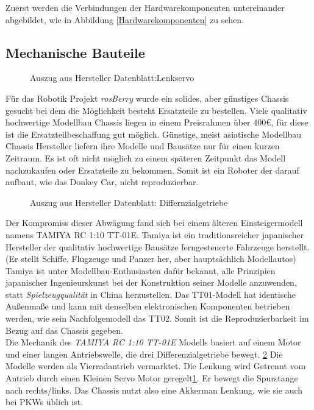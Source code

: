\documentclass[conference]{IEEEtran}
\begin{document}
	Zuerst werden die Verbindungen der Hardwarekomponenten untereinander abgebildet, wie in Abbildung \ref{Hardwarekomponenten} zu sehen.
	\subsection{Mechanische Bauteile}
	
	\begin{figure} [!h]
		\centering
		\caption{Auszug aus Hersteller Datenblatt:Lenkservo }
		\label{Servomotor}
	\end{figure}
	Für das Robotik Projekt \textit{rosBerry} wurde ein solides, aber günstiges Chassis gesucht bei dem die Möglichkeit besteht Ersatzteile zu bestellen. Viele qualitativ hochwertige Modellbau Chassis liegen in einem Preisrahmen über 400€, für diese ist die Ersatzteilbeschaffung gut möglich. Günstige, meist asiatische Modellbau Chassis Hersteller liefern ihre Modelle und Bausätze nur für einen kurzen Zeitraum. Es ist oft nicht möglich zu einem späteren Zeitpunkt das Modell nachzukaufen oder Ersatzteile zu bekommen. Somit ist ein Roboter der darauf aufbaut, wie das Donkey Car, nicht reproduzierbar. 
	\\
	\begin{figure} %
		\centering
		\caption{Auszug aus Hersteller Datenblatt: Differnzialgetriebe }
		\label{Getriebe}
	\end{figure}
	Der Kompromiss dieser Abwägung fand sich bei einem älteren 
	Einsteigermodell namens TAMIYA RC 1:10 TT-01E. Tamiya ist ein 
	traditionsreicher japanischer Hersteller der qualitativ hochwertige Bausätze 
	ferngesteuerte Fahrzeuge herstellt. (Er stellt Schiffe, Flugzeuge und Panzer 
	her, aber hauptsächlich Modellautos) Tamiya ist unter 
	Modellbau-Enthusiasten dafür bekannt, alle Prinzipien japanischer 
	Ingenieurskunst bei der Konstruktion seiner Modelle anzuwenden, statt 
	\textit{Spielzeugqualität} in China herzustellen. Das TT01-Modell hat 
	identische Außenmaße und kann mit denselben elektronischen Komponenten 
	betrieben werden, wie sein Nachfolgemodell das TT02. Somit ist die 
	Reproduzierbarkeit im Bezug auf das Chassis gegeben.
	\\
	Die Mechanik des \textit{TAMIYA RC 1:10 TT-01E } Modells basiert auf 
	einem Motor und einer langen Antriebswelle, die drei Differenzialgetriebe 
	bewegt. \ref{Getriebe} Die Modelle werden als Vierradantrieb vermarktet. 
	Die Lenkung wird Getrennt vom Antrieb durch einen Kleinen Servo Motor 
	geregelt\ref{Servomotor}. Er bewegt die Spurstange nach rechts/links. Das 
	Chassis nutzt also eine Akkerman Lenkung, wie sie auch bei PKWs üblich ist.
	
\end{document}
